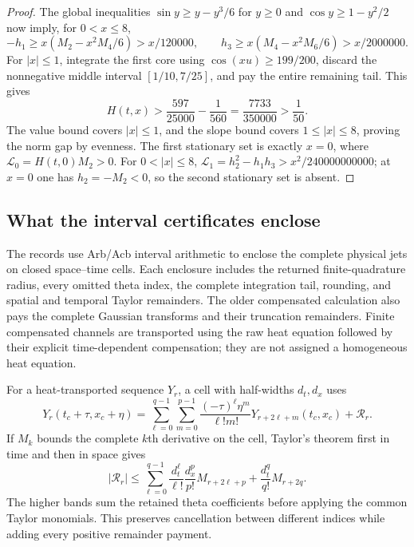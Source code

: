 \documentclass[11pt]{article}
\numberwithin{equation}{section}
\theoremstyle{definition}
\theoremstyle{remark}
\begin{document}
\begin{proof}
The global inequalities $\sin y\ge y-y^3/6$ for $y\ge0$ and
$\cos y\ge1-y^2/2$ now imply, for $0<x\le8$,
\[
 -h_1\ge x(M_2-x^2M_4/6)>x/120000,
 \qquad h_3\ge x(M_4-x^2M_6/6)>x/2000000.
\]
For $|x|\le1$, integrate the first core using
$\cos(xu)\ge199/200$, discard the nonnegative middle interval
$[1/10,7/25]$, and pay the entire remaining tail.  This gives
\[
 H(t,x)>\frac{597}{25000}-\frac1{560}
 =\frac{7733}{350000}>\frac1{50}.
\]
The value bound covers $|x|\le1$, and the slope bound covers
$1\le|x|\le8$, proving the norm gap by evenness.
The first stationary set is exactly $x=0$, where
$\mathcal L_0=H(t,0)M_2>0$.
For $0<|x|\le8$,
$\mathcal L_1=h_2^2-h_1h_3>x^2/240000000000$;
at $x=0$ one has $h_2=-M_2<0$, so the second stationary set is absent.
\end{proof}

\subsection{What the interval certificates enclose}

The records use Arb/Acb interval arithmetic to enclose the complete
physical jets on closed space--time cells.  Each enclosure includes
the returned finite-quadrature radius, every omitted theta index,
the complete integration tail, rounding, and spatial and temporal
Taylor remainders.  The older compensated calculation also pays the
complete Gaussian transforms and their truncation remainders.
Finite compensated channels are transported using the raw heat
equation followed by their explicit time-dependent compensation;
they are not assigned a homogeneous heat equation.

For a heat-transported sequence $Y_r$, a cell with half-widths
$d_t,d_x$ uses
\[
 Y_r(t_c+\tau,x_c+\eta)=
 \sum_{\ell=0}^{q-1}\sum_{m=0}^{p-1}
 \frac{(-\tau)^\ell\eta^m}{\ell!m!}Y_{r+2\ell+m}(t_c,x_c)
 +\mathcal R_r.
\]
If $M_k$ bounds the complete $k$th derivative on the cell, Taylor's
theorem first in time and then in space gives
\begin{equation}
 |\mathcal R_r|\le
 \sum_{\ell=0}^{q-1}\frac{d_t^\ell}{\ell!}
 \frac{d_x^p}{p!}M_{r+2\ell+p}
 +\frac{d_t^q}{q!}M_{r+2q}.
 \label{fc:taylor-payment}
\end{equation}
The higher bands sum the retained theta coefficients before applying
the common Taylor monomials.  This preserves cancellation between
different indices while adding every positive remainder payment.
\end{document}

